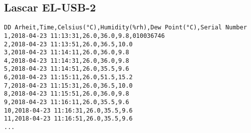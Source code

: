 \subsection*{Lascar EL-USB-2}
\begin{lstlisting}[language={},inputencoding={utf8}]
DD Arheit,Time,Celsius(°C),Humidity(%rh),Dew Point(°C),Serial Number
1,2018-04-23 11:13:31,26.0,36.0,9.8,010036746
2,2018-04-23 11:13:51,26.0,36.5,10.0
3,2018-04-23 11:14:11,26.0,36.0,9.8
4,2018-04-23 11:14:31,26.0,36.0,9.8
5,2018-04-23 11:14:51,26.0,35.5,9.6
6,2018-04-23 11:15:11,26.0,51.5,15.2
7,2018-04-23 11:15:31,26.0,36.5,10.0
8,2018-04-23 11:15:51,26.0,36.0,9.8
9,2018-04-23 11:16:11,26.0,35.5,9.6
10,2018-04-23 11:16:31,26.0,35.5,9.6
11,2018-04-23 11:16:51,26.0,35.5,9.6
...
\end{lstlisting}
